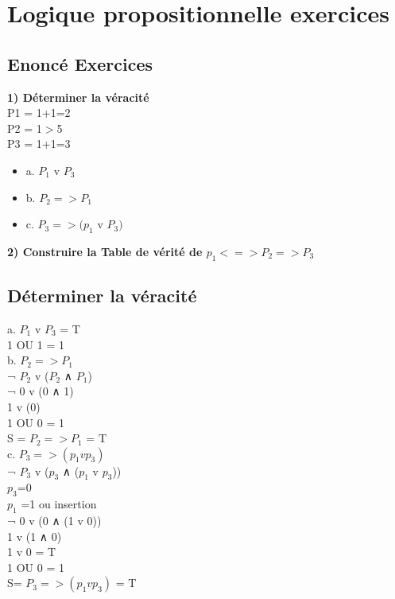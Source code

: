 \newpage

\chapter{Logique propositionnelle exercices}
\vspace{5mm} %

\section{Enoncé Exercices}
\vspace{5mm} %

\textbf{1) Déterminer la véracité} \\

P1 = 1+1=2  \\
P2 = 1$>$5 \\
P3 = 1+1=3 \\

\begin{itemize}
\item {a. $P_1$ v $P_3$}
\item {b. $P_2 => P_1$}
\item {c. $P_3 => (p_1$ v $P_3)$}
\end{itemize}

\textbf{2) Construire la Table de vérité de $p_1 <=> P_2 => P_3$} \\

\vspace{5mm} %
\section{Déterminer la véracité}

a. $P_1$ v $P_3$ = T \\
1 OU 1 = 1\\

b. $P_2 => P_1$ \\
¬ $P_2$ v ($P_2$ ∧ $P_1$) \\
¬ 0 v (0 ∧ 1) \\
1 v (0) \\
1 OU 0 = 1\\
S = $P_2 => P_1$ = T \\

c. $P_3 => (p_1 v p_3)$ \\
¬ $P_3$ v ($p_3$ ∧ ($p_1$ v $p_3$)) \\
$p_3$=0 \\
$p_1$ =1 ou insertion \\
¬ 0 v (0 ∧ (1 v 0)) \\
1 v (1 ∧ 0) \\
1 v 0 = T \\
1 OU 0 = 1 \\
S= $P_3 => (p_1 v p_3)$ = T\\

